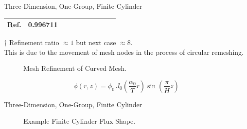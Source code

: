 \begin{frame}{Three-Dimension, One-Group, Finite Cylinder}
\begin{table}
\begin{center}
{\begin{threeparttable}
\begin{tabular}{cccccccccc}
        Ref. & 0.996711 \\
        \bottomrule
      \end{tabular}
        \begin{tablenotes}
        \item[$\dagger$] Refinement ratio $\approx 1$ but next case $\approx
          8$.\\
          This is due to the movement of mesh nodes in the process of circular
          remeshing.
        \end{tablenotes}
      \end{threeparttable}
    }
    \end{center}
  \end{table}
  \vspace{-0.2in}
  \begin{figure}
    \centering
    \vspace{0.2in}
    \caption{Mesh Refinement of Curved Mesh.}
    \label{fig:circle_meshes}
  \end{figure}
  \begin{equation}
    \label{eq:analytic_finite_cyl}
    \phi(r,z) = \phi_0 \, 
      J_0\left(\frac{\alpha_0}{T} r\right) \sin\left(\frac{\pi}{H} z \right)
  \end{equation}
\end{frame}

\begin{frame}{Three-Dimension, One-Group, Finite Cylinder}
  \begin{figure}
    \centering
    \hspace{0.2in}
    \caption{Example Finite Cylinder Flux Shape.}
    \label{fig:finite_cyl}
  \end{figure}
\end{frame}

